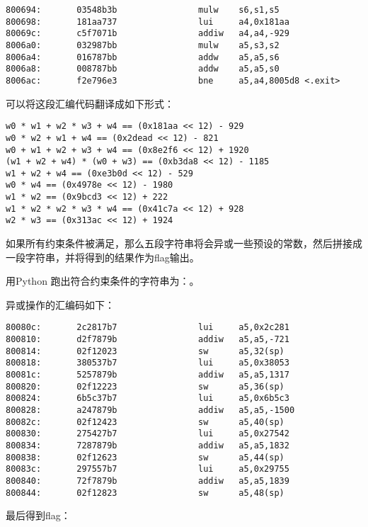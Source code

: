\documentclass[a4paper,UTF8]{ctexart}
\begin{document}
\begin{verbatim}
800694:       03548b3b                mulw    s6,s1,s5
800698:       181aa737                lui     a4,0x181aa
80069c:       c5f7071b                addiw   a4,a4,-929
8006a0:       032987bb                mulw    a5,s3,s2
8006a4:       016787bb                addw    a5,a5,s6
8006a8:       008787bb                addw    a5,a5,s0
8006ac:       f2e796e3                bne     a5,a4,8005d8 <.exit>
\end{verbatim}

可以将这段汇编代码翻译成如下形式：

\begin{verbatim}
w0 * w1 + w2 * w3 + w4 == (0x181aa << 12) - 929
w0 * w2 + w1 + w4 == (0x2dead << 12) - 821
w0 + w1 + w2 + w3 + w4 == (0x8e2f6 << 12) + 1920
(w1 + w2 + w4) * (w0 + w3) == (0xb3da8 << 12) - 1185
w1 + w2 + w4 == (0xe3b0d << 12) - 529
w0 * w4 == (0x4978e << 12) - 1980
w1 * w2 == (0x9bcd3 << 12) + 222
w1 * w2 * w2 * w3 * w4 == (0x41c7a << 12) + 928
w2 * w3 == (0x313ac << 12) + 1924
\end{verbatim}

如果所有约束条件被满足，那么五段字符串将会异或一些预设的常数，然后拼接成一段字符串，并将得到的结果作为flag输出。

用Python 跑出符合约束条件的字符串为：。

异或操作的汇编码如下：

\begin{verbatim}
80080c:       2c2817b7                lui     a5,0x2c281
800810:       d2f7879b                addiw   a5,a5,-721
800814:       02f12023                sw      a5,32(sp)
800818:       380537b7                lui     a5,0x38053
80081c:       5257879b                addiw   a5,a5,1317
800820:       02f12223                sw      a5,36(sp)
800824:       6b5c37b7                lui     a5,0x6b5c3
800828:       a247879b                addiw   a5,a5,-1500
80082c:       02f12423                sw      a5,40(sp)
800830:       275427b7                lui     a5,0x27542
800834:       7287879b                addiw   a5,a5,1832
800838:       02f12623                sw      a5,44(sp)
80083c:       297557b7                lui     a5,0x29755
800840:       72f7879b                addiw   a5,a5,1839
800844:       02f12823                sw      a5,48(sp)
\end{verbatim}

最后得到flag：
\end{document}
